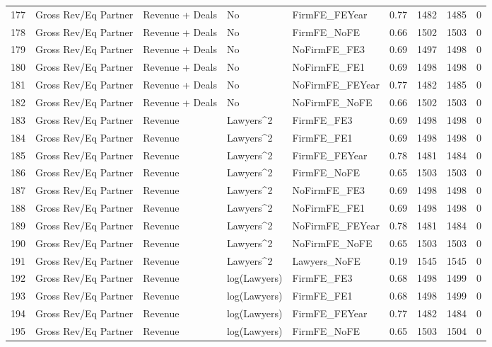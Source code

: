 \documentclass{article}
\begin{document}
\begin{table}[H]
\begin{tabular}{rllllllll}
  177 & Gross Rev/Eq Partner & Revenue + Deals & No & FirmFE\_FEYear & 0.77 & 1482 & 1485 & 0 \\ 
  178 & Gross Rev/Eq Partner & Revenue + Deals & No & FirmFE\_NoFE & 0.66 & 1502 & 1503 & 0 \\ 
  179 & Gross Rev/Eq Partner & Revenue + Deals & No & NoFirmFE\_FE3 & 0.69 & 1497 & 1498 & 0 \\ 
  180 & Gross Rev/Eq Partner & Revenue + Deals & No & NoFirmFE\_FE1 & 0.69 & 1498 & 1498 & 0 \\ 
  181 & Gross Rev/Eq Partner & Revenue + Deals & No & NoFirmFE\_FEYear & 0.77 & 1482 & 1485 & 0 \\ 
  182 & Gross Rev/Eq Partner & Revenue + Deals & No & NoFirmFE\_NoFE & 0.66 & 1502 & 1503 & 0 \\ 
  183 & Gross Rev/Eq Partner & Revenue & Lawyers^2 & FirmFE\_FE3 & 0.69 & 1498 & 1498 & 0 \\ 
  184 & Gross Rev/Eq Partner & Revenue & Lawyers^2 & FirmFE\_FE1 & 0.69 & 1498 & 1498 & 0 \\ 
  185 & Gross Rev/Eq Partner & Revenue & Lawyers^2 & FirmFE\_FEYear & 0.78 & 1481 & 1484 & 0 \\ 
  186 & Gross Rev/Eq Partner & Revenue & Lawyers^2 & FirmFE\_NoFE & 0.65 & 1503 & 1503 & 0 \\ 
  187 & Gross Rev/Eq Partner & Revenue & Lawyers^2 & NoFirmFE\_FE3 & 0.69 & 1498 & 1498 & 0 \\ 
  188 & Gross Rev/Eq Partner & Revenue & Lawyers^2 & NoFirmFE\_FE1 & 0.69 & 1498 & 1498 & 0 \\ 
  189 & Gross Rev/Eq Partner & Revenue & Lawyers^2 & NoFirmFE\_FEYear & 0.78 & 1481 & 1484 & 0 \\ 
  190 & Gross Rev/Eq Partner & Revenue & Lawyers^2 & NoFirmFE\_NoFE & 0.65 & 1503 & 1503 & 0 \\ 
  191 & Gross Rev/Eq Partner & Revenue & Lawyers^2 & Lawyers\_NoFE & 0.19 & 1545 & 1545 & 0 \\ 
  192 & Gross Rev/Eq Partner & Revenue & log(Lawyers) & FirmFE\_FE3 & 0.68 & 1498 & 1499 & 0 \\ 
  193 & Gross Rev/Eq Partner & Revenue & log(Lawyers) & FirmFE\_FE1 & 0.68 & 1498 & 1499 & 0 \\ 
  194 & Gross Rev/Eq Partner & Revenue & log(Lawyers) & FirmFE\_FEYear & 0.77 & 1482 & 1484 & 0 \\ 
  195 & Gross Rev/Eq Partner & Revenue & log(Lawyers) & FirmFE\_NoFE & 0.65 & 1503 & 1504 & 0 \\ 

\end{tabular}
\end{table}
\end{document}
